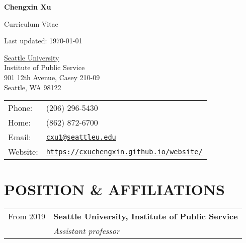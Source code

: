 \documentclass[letterpaper]{article}
\def\name{Chengxin Xu}
\renewenvironment{itemize}{
  \begin{list}{}{
    \setlength{\leftmargin}{1.5em}
  }
}{
  \end{list}
}
\begin{document}

\centerline{\huge \bf \name}

\begin{center}
  Curriculum Vitae
\end{center}


\begin{center}
  \begin{footnotesize}
    Last updated: \today \\
  \end{footnotesize}
\end{center}

\vspace{0.25in}

\begin{minipage}{0.45\linewidth}
  \href{https://www.seattleu.edu/artsci/departments/ips/}{Seattle University} \\
  Institute of Public Service \\
  901 12th Avenue, Casey 210-09 \\ 
  Seattle, WA 98122
\end{minipage}
\begin{minipage}{0.45\linewidth}
  \begin{tabular}{ll}
    Phone: & (206) 296-5430 \\
    Home: & (862) 872-6700 \\
    Email: & \href{mailto:cxu1@seattleu.edu}{\tt cxu1@seattleu.edu} \\
    Website: & \href{https://cxuchengxin.github.io/website/}{\tt https://cxuchengxin.github.io/website/} \\
  \end{tabular}
\end{minipage}




\section*{POSITION \& AFFILIATIONS}
\begin{tabular}{ p{2.5cm} p{13cm} }
	From 2019 & \textbf{Seattle University, Institute of Public Service} \\
	& \it{Assistant professor}

\end{tabular}
\end{document}
